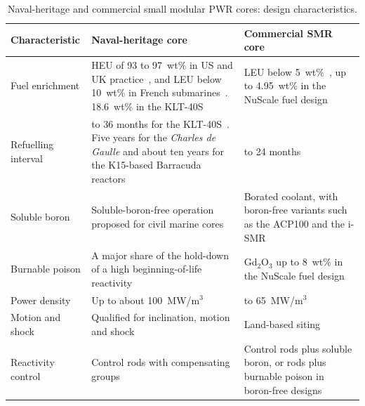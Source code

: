 \begin{table}[htbp]
  \centering
  \footnotesize
  \caption{Naval-heritage and commercial small modular PWR cores: design characteristics.}
  \label{tab:naval-vs-commercial}
  \begin{tabularx}{\textwidth}{@{}>{\raggedright\arraybackslash}p{2.8cm} >{\raggedright\arraybackslash}X >{\raggedright\arraybackslash}X@{}}
    \toprule
    \textbf{Characteristic} & \textbf{Naval-heritage core} &
    \textbf{Commercial SMR core} \\
    \midrule
    Fuel enrichment &
    HEU of 93 to 97~wt\% in US and UK practice~\cite{jason_2016}, and LEU
    below 10~wt\% in French submarines~\cite{ippolito_1990}. 18.6~wt\% in
    the KLT-40S~\cite{worldnuclearreport_smr} &
    LEU below 5~wt\%~\cite{iaea_smr_2024}, up to 4.95~wt\% in the NuScale
    fuel design~\cite{nuscale_htp2_2017} \\
    \addlinespace
    Refuelling interval &
    30 to 36 months for the KLT-40S~\cite{worldnuclearreport_smr}. Five
    years for the \emph{Charles de Gaulle} and about ten years for the
    K15-based Barracuda reactors~\cite{wna_ships} &
    18 to 24 months~\cite{iaea_smr_2024} \\
    \addlinespace
    Soluble boron &
    Soluble-boron-free operation proposed for civil marine
    cores~\cite{alam_partI_2019} &
    Borated coolant, with boron-free variants such as the ACP100 and the
    i-SMR~\cite{acp100_physor2020,ismr_sbf_2024} \\
    \addlinespace
    Burnable poison &
    A major share of the hold-down of a high beginning-of-life
    reactivity~\cite{alam_partI_2019,ippolito_1990} &
    Gd$_2$O$_3$ up to 8~wt\% in the NuScale fuel
    design~\cite{nuscale_htp2_2017} \\
    \addlinespace
    Power density &
    Up to about 100~MW/m$^3$~\cite{alam_2019_hotchannel} &
    60 to 65~MW/m$^3$~\cite{alam_2019_hotchannel} \\
    \addlinespace
    Motion and shock &
    Qualified for inclination, motion and shock~\cite{ritm200n_nei_2024} &
    Land-based siting~\cite{iaea_smr_2024} \\
    \addlinespace
    Reactivity control &
    Control rods with compensating groups~\cite{worldnuclearreport_smr} &
    Control rods plus soluble boron, or rods plus burnable poison in
    boron-free designs~\cite{acp100_physor2020,ismr_sbf_2024} \\
    \bottomrule
  \end{tabularx}
\end{table}

